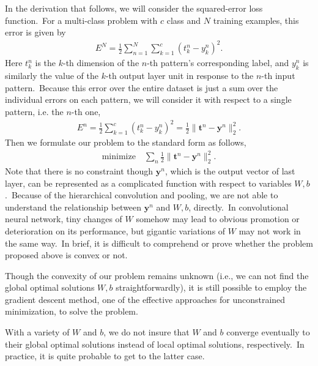 In the derivation that follows, we will consider the squared-error loss function.~For a multi-class problem with $c$ class and $N$ training examples, this error is given by
\begin{align}
	E^N = \frac{1}{2} \sum_{n=1}^{N} \sum_{k=1}^{c} (t_k^n - y_k^n)^2.
\end{align}
Here $t_k^n$ is the $k$-th dimension of the $n$-th pattern's corresponding label, and $y_k^n$ is similarly the value of the $k$-th output layer unit in response to the $n$-th input pattern.~Because this error over the entire dataset is just a sum over the individual errors on each pattern, we will consider it with respect to a single pattern, i.e. the $n$-th one,
\begin{align}
	E^n = \frac{1}{2} \sum_{k=1}^{c} (t_k^n - y_k^n)^2 = \frac{1}{2} \parallel \bm{t}^n - \bm{y}^n \parallel _2^2.
\end{align}
Then we formulate our problem to the standard form as follows, 
\begin{align}
\text{minimize} \quad \sum_n \frac{1}{2} \parallel \bm{t}^n - \bm{y}^n \parallel _2^ 2.
\end{align}
Note that there is no constraint though $\bm{y}^n$, which is the output vector of last layer, can be represented as a complicated function with respect to variables $W,b$.~Because of the hierarchical convolution and pooling, we are not able to understand the relationship between $\bm{y}^n$ and $W,b$, directly.~In convolutional neural network, tiny changes of $W$ somehow may lead to obvious promotion or deterioration on its performance, but gigantic variations of $W$ may not work in the same way.~In brief, it is difficult to comprehend or prove whether the problem proposed above is convex or not.

Though the convexity of our problem remains unknown (i.e., we can not find the global optimal solutions $W,b$ straightforwardly), it is still possible to employ the gradient descent method, one of the effective approaches for unconstrained minimization, to solve the problem. 

With a variety of $W$ and $b$, we do not insure that $W$ and $b$ converge eventually to their global optimal solutions instead of local optimal solutions, respectively.~In practice, it is quite probable to get to the latter case.
